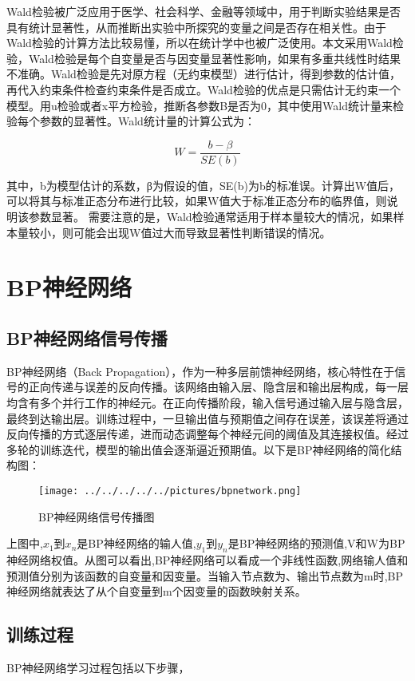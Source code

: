 Wald检验被广泛应用于医学、社会科学、金融等领域中，用于判断实验结果是否具有统计显著性，从而推断出实验中所探究的变量之间是否存在相关性。由于Wald检验的计算方法比较易懂，所以在统计学中也被广泛使用。本文采用Wald检验，Wald检验是每个自变量是否与因变量显著性影响，如果有多重共线性时结果不准确。Wald检验是先对原方程（无约束模型）进行估计，得到参数的估计值，再代入约束条件检查约束条件是否成立。Wald检验的优点是只需估计无约束一个模型。用u检验或者x平方检验，推断各参数B是否为0，其中使用Wald统计量来检验每个参数的显著性。Wald统计量的计算公式为：

\begin{equation}
	W = \frac{b-\beta}{SE(b)} 
\end{equation}

其中，b为模型估计的系数，β为假设的值，SE(b)为b的标准误。计算出W值后，可以将其与标准正态分布进行比较，如果W值大于标准正态分布的临界值，则说明该参数显著。
需要注意的是，Wald检验通常适用于样本量较大的情况，如果样本量较小，则可能会出现W值过大而导致显著性判断错误的情况。


\section{BP神经网络}
\subsection{BP神经网络信号传播}
BP神经网络（Back Propagation），作为一种多层前馈神经网络，核心特性在于信号的正向传递与误差的反向传播。该网络由输入层、隐含层和输出层构成，每一层均含有多个并行工作的神经元。在正向传播阶段，输入信号通过输入层与隐含层，最终到达输出层。训练过程中，一旦输出值与预期值之间存在误差，该误差将通过反向传播的方式逐层传递，进而动态调整每个神经元间的阈值及其连接权值。经过多轮的训练迭代，模型的输出值会逐渐逼近预期值。以下是BP神经网络的简化结构图：

\begin{figure}[!h]
	\centering
	\texttt{[image: ../../../../../pictures/bpnetwork.png]}
	\caption{BP神经网络信号传播图}
\end{figure}

上图中,$x_1$到$x_n$是BP神经网络的输人值,$y_1$到$y_n$是BP神经网络的预测值,V和W为BP神经网络权值。从图可以看出,BP神经网络可以看成一个非线性函数,网络输人值和预测值分别为该函数的自变量和因变量。当输入节点数为、输出节点数为m时,BP神经网络就表达了从个自变量到m个因变量的函数映射关系。
\iffalse
\subsection{训练过程}
BP神经网络学习过程包括以下步骤，

